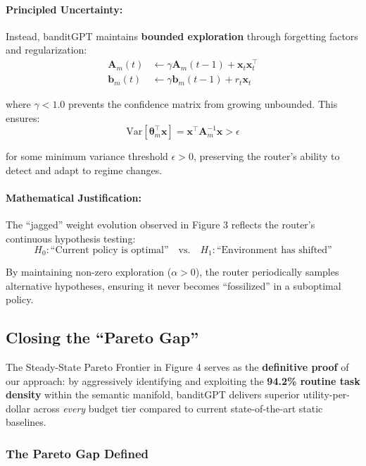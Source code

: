 \documentclass[sigconf]{acmart}
\begin{document}
\paragraph{Principled Uncertainty:}
Instead, banditGPT maintains \textbf{bounded exploration} through forgetting factors and regularization:
\begin{align}
\mathbf{A}_m(t) &\leftarrow \gamma \mathbf{A}_m(t-1) + \mathbf{x}_t \mathbf{x}_t^\top \\
\mathbf{b}_m(t) &\leftarrow \gamma \mathbf{b}_m(t-1) + r_t \mathbf{x}_t
\end{align}

where $\gamma < 1.0$ prevents the confidence matrix from growing unbounded. This ensures:
\begin{equation}
\text{Var}[\boldsymbol{\theta}_m^\top \mathbf{x}] = \mathbf{x}^\top \mathbf{A}_m^{-1} \mathbf{x} > \epsilon
\end{equation}

for some minimum variance threshold $\epsilon > 0$, preserving the router's ability to detect and adapt to regime changes.

\paragraph{Mathematical Justification:}
The ``jagged'' weight evolution observed in Figure 3 reflects the router's continuous hypothesis testing:
\begin{equation}
H_0: \text{``Current policy is optimal''} \quad \text{vs.} \quad H_1: \text{``Environment has shifted''}
\end{equation}

By maintaining non-zero exploration ($\alpha > 0$), the router periodically samples alternative hypotheses, ensuring it never becomes ``fossilized'' in a suboptimal policy.

\subsection{Closing the ``Pareto Gap''}

The Steady-State Pareto Frontier in Figure 4 serves as the \textbf{definitive proof} of our approach: by aggressively identifying and exploiting the \textbf{94.2\% routine task density} within the semantic manifold, banditGPT delivers superior utility-per-dollar across \emph{every} budget tier compared to current state-of-the-art static baselines.

\subsubsection{The Pareto Gap Defined}
\end{document}
